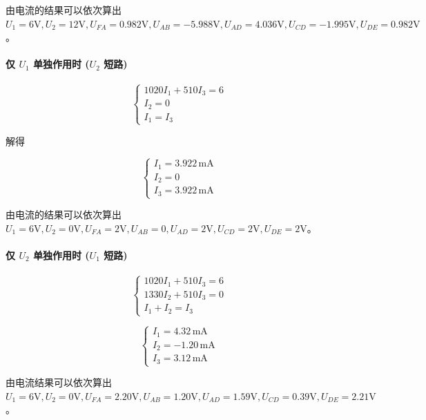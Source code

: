 \documentclass{Report} %
\begin{document}
由电流的结果可以依次算出 $U_1 = 6\text{V}, U_2 = 12\text{V}, U_{FA} = 0.982\text{V}, U_{AB} = -5.988\text{V}, U_{AD} = 4.036\text{V}, U_{CD} = -1.995\text{V}, U_{DE} = 0.982\text{V}$。

\paragraph{仅 $U_1$ 单独作用时 ($U_2$ 短路)}
\begin{equation}
\begin{cases}
    1020I_1 + 510I_3 = 6 \\
    I_2 = 0 \\
    I_1 = I_3
\end{cases}
\end{equation}

解得

\begin{equation}
\begin{cases}
    I_1 = 3.922\,\text{mA} \\
    I_2 = 0 \\
    I_3 = 3.922\,\text{mA}
\end{cases}
\end{equation}

由电流的结果可以依次算出 $U_1 = 6\text{V}, U_2 = 0\text{V}, U_{FA} = 2\text{V}, U_{AB} = 0, U_{AD} = 2\text{V}, U_{CD} = 2\text{V}, U_{DE} = 2\text{V}$。
\paragraph{仅 $U_2$ 单独作用时 ($U_1$ 短路)}
\begin{equation}
\begin{cases}
    1020I_1 + 510I_3 = 6 \\
    1330I_2 + 510I_3 = 0 \\
    I_1 + I_2 = I_3
\end{cases}
\end{equation}

\begin{equation}
\begin{cases}
    I_1 = 4.32\,\text{mA} \\
    I_2 = -1.20\,\text{mA} \\
    I_3 = 3.12\,\text{mA}
\end{cases}
\end{equation}

由电流结果可以依次算出 $U_1 = 6\text{V}, U_2 = 0\text{V}, U_{FA} = 2.20\text{V}, U_{AB} = 1.20\text{V}, U_{AD} = 1.59\text{V}, U_{CD} = 0.39\text{V}, U_{DE} = 2.21\text{V}$。
\end{document}
